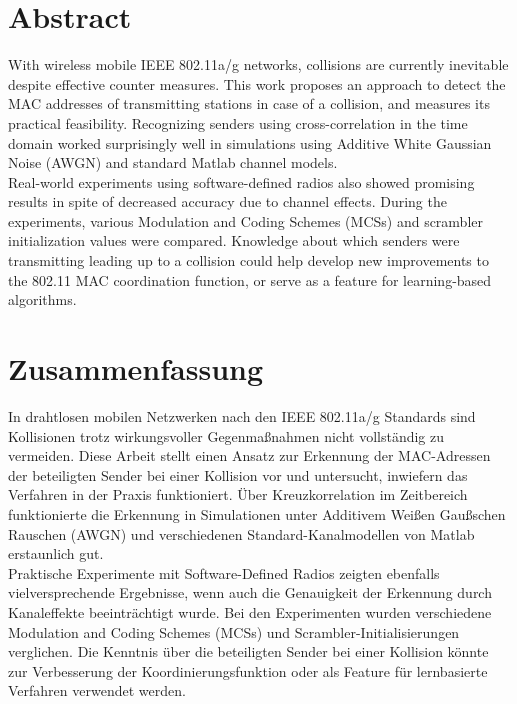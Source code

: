 

\begingroup
\let\clearpage\relax
\let\cleardoublepage\relax
\let\cleardoublepage\relax

\chapter*{Abstract}

With wireless mobile IEEE 802.11a/g networks, collisions are currently inevitable despite effective counter measures. This work proposes an approach to detect the MAC addresses of transmitting stations in case of a collision, and measures its practical feasibility. Recognizing senders using cross-correlation in the time domain worked surprisingly well in simulations using Additive White Gaussian Noise (AWGN) and standard Matlab channel models.\\

Real-world experiments using software-defined radios also showed promising results in spite of decreased accuracy due to channel effects. During the experiments, various Modulation and Coding Schemes (MCSs) and scrambler initialization values were compared. Knowledge about which senders were transmitting leading up to a collision could help develop new improvements to the 802.11 MAC coordination function, or serve as a feature for learning-based algorithms.



\vfill
{}
\chapter*{Zusammenfassung}

In drahtlosen mobilen Netzwerken nach den IEEE 802.11a/g Standards sind Kollisionen trotz wirkungsvoller Gegenmaßnahmen nicht vollständig zu vermeiden. Diese Arbeit stellt einen Ansatz zur Erkennung der MAC-Adressen der beteiligten Sender bei einer Kollision vor und untersucht, inwiefern das Verfahren in der Praxis funktioniert. Über Kreuzkorrelation im Zeitbereich funktionierte die Erkennung in Simulationen unter Additivem Weißen Gaußschen Rauschen (AWGN) und verschiedenen Standard-Kanalmodellen von Matlab erstaunlich gut.\\

Praktische Experimente mit Software-Defined Radios zeigten ebenfalls vielversprechende Ergebnisse, wenn auch die Genauigkeit der Erkennung durch Kanaleffekte beeinträchtigt wurde. Bei den Experimenten wurden verschiedene Modulation and Coding Schemes (MCSs) und Scrambler-Initialisierungen verglichen. Die Kenntnis über die beteiligten Sender bei einer Kollision könnte zur Verbesserung der Koordinierungsfunktion oder als Feature für lernbasierte Verfahren verwendet werden.


\endgroup
\vfill
